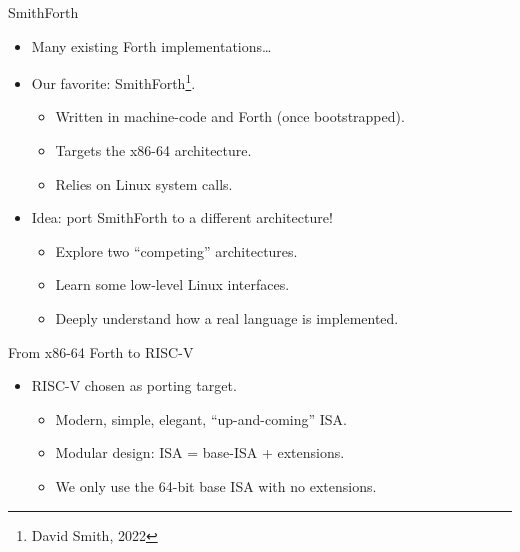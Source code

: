 \documentclass[presentation, bigger]{beamer}
\begin{document}
\begin{frame}[label={sec:orge636368}]{SmithForth}
\begin{itemize}
\item Many existing Forth implementations\dots{}
\item Our favorite: SmithForth\footnote{David Smith, 2022}. \pause
\begin{itemize}
\item Written in machine-code and Forth (once bootstrapped).
\item Targets the x86-64 architecture.
\item Relies on Linux system calls. \pause
\end{itemize}
\item Idea: port SmithForth to a different architecture! \pause
\begin{itemize}
\item Explore two ``competing'' architectures. \pause
\item Learn some low-level Linux interfaces. \pause
\item Deeply understand how a real language is implemented.
\end{itemize}
\end{itemize}
\end{frame}

\begin{frame}[label={sec:org3ca087c}]{From x86-64 Forth to RISC-V}
\begin{itemize}
\item RISC-V chosen as porting target.
\begin{itemize}
\item Modern, simple, elegant, ``up-and-coming'' ISA.
\item Modular design: ISA = base-ISA + extensions.
\item We only use the 64-bit base ISA with no extensions.
\end{itemize}
\end{itemize}
\end{frame}
\end{document}
